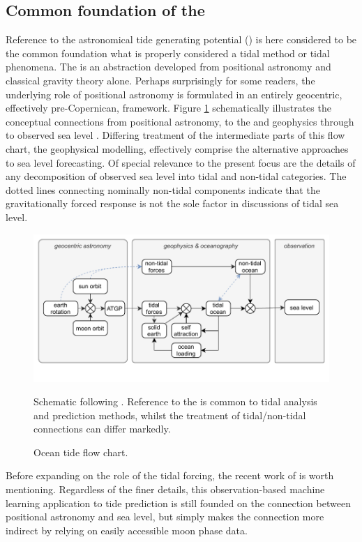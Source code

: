 \subsection{Common foundation of the \ATGP{}}
Reference to the astronomical tide generating potential (\ATGP{}) is here considered to be the common foundation what is properly considered a tidal method or tidal phenomena.  
The \ATGP{} is an abstraction developed from positional astronomy and classical gravity theory alone.   Perhaps surprisingly for some readers, the underlying role of positional astronomy is formulated in an entirely geocentric, effectively pre-Copernican, framework. 
Figure \ref{fig:tideForceFlow} schematically illustrates the conceptual connections from positional astronomy, to the \ATGP{} and geophysics through to observed sea level .  
Differing treatment of the intermediate parts of this flow chart, the geophysical modelling, effectively comprise the alternative approaches to sea level forecasting.  Of special relevance to the present focus are the details of any decomposition of observed sea level into tidal and non-tidal categories.   The dotted lines connecting nominally non-tidal components indicate that the gravitationally forced response is not the sole factor in discussions of tidal sea level. 
\begin{figure}[!hbt] \centering
    \includegraphics[width=\figwidthFull]{figures/diagrams/tidal_force_flowchart.pdf}
    \caption{Ocean tide flow chart.}{Schematic following \citet{agnew2015}.  Reference to the \ATGP{} is common to tidal analysis and prediction methods, whilst the treatment of tidal/non-tidal connections can differ markedly.}
    \label{fig:tideForceFlow}
\end{figure}
Before expanding on the role of the tidal forcing, the recent work of \citet{10.1016/j.oceaneng.2020.107013} is worth mentioning.   Regardless of the finer details, this observation-based machine learning application to tide prediction is still founded on the connection between positional astronomy and sea level, but simply makes the connection more indirect by relying on easily accessible moon phase data.
